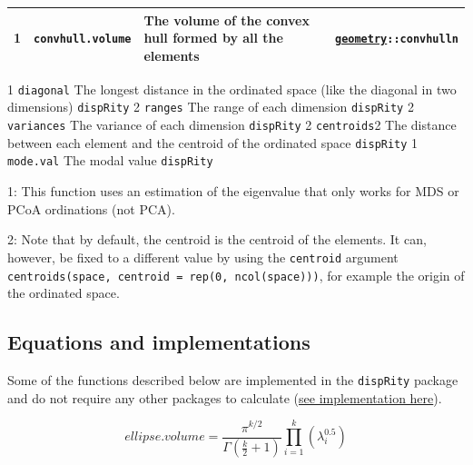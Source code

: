 \documentclass[]{book}
\theoremstyle{definition}
\theoremstyle{definition}
\theoremstyle{remark}
\begin{document}
\begin{longtable}[]{@{}llll@{}}
\begin{minipage}[t]{0.08\columnwidth}
1\strut
\end{minipage} & \begin{minipage}[t]{0.08\columnwidth}\raggedright\strut
\texttt{convhull.volume}\strut
\end{minipage} & \begin{minipage}[t]{0.61\columnwidth}\raggedright\strut
The volume of the convex hull formed by all the elements\strut
\end{minipage} & \begin{minipage}[t]{0.11\columnwidth}\raggedright\strut
\href{https://cran.r-project.org/web/packages/geometry/index.html}{\texttt{geometry}}\texttt{::convhulln}\strut
\end{minipage}\tabularnewline
\bottomrule
\end{longtable}

1 \textbar{} \texttt{diagonal} \textbar{} The longest distance in the
ordinated space (like the diagonal in two dimensions) \textbar{}
\texttt{dispRity} \textbar{} 2 \textbar{} \texttt{ranges} \textbar{} The
range of each dimension \textbar{} \texttt{dispRity} \textbar{} 2
\textbar{} \texttt{variances} \textbar{} The variance of each dimension
\textbar{} \texttt{dispRity} \textbar{} 2 \textbar{} \texttt{centroids}2
\textbar{} The distance between each element and the centroid of the
ordinated space \textbar{} \texttt{dispRity} \textbar{} 1 \textbar{}
\texttt{mode.val} \textbar{} The modal value \textbar{}
\texttt{dispRity} \textbar{}

1: This function uses an estimation of the eigenvalue that only works
for MDS or PCoA ordinations (not PCA).

2: Note that by default, the centroid is the centroid of the elements.
It can, however, be fixed to a different value by using the
\texttt{centroid} argument
\texttt{centroids(space,\ centroid\ =\ rep(0,\ ncol(space)))}, for
example the origin of the ordinated space.

\subsection{Equations and
implementations}\label{equations-and-implementations}

Some of the functions described below are implemented in the
\texttt{dispRity} package and do not require any other packages to
calculate
(\href{https://github.com/TGuillerme/dispRity/blob/master/R/dispRity.metric.R}{see
implementation here}).

\begin{equation}
    ellipse.volume = \frac{\pi^{k/2}}{\Gamma(\frac{k}{2}+1)}\displaystyle\prod_{i=1}^{k} (\lambda_{i}^{0.5})
\end{equation}
\end{document}
